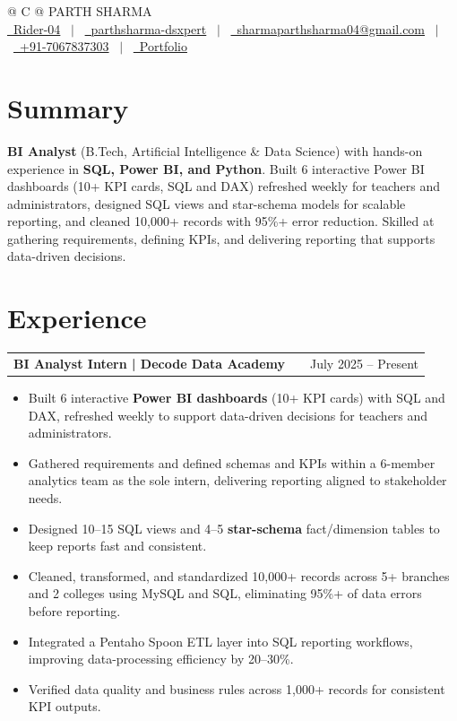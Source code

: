 \documentclass[a4paper,12pt]{article}
\makeatletter
\newenvironment{joblong}[2]
    {
    \begin{tabularx}{\linewidth}{@{}l X r@{}}
    \textbf{#1} & \hfill &  #2 \\[3.75pt]
    \end{tabularx}
    \begin{minipage}[t]{\linewidth}
    \begin{itemize}[nosep,after=\strut, leftmargin=1em, itemsep=3pt,label=--]
    }
    {
    \end{itemize}
    \end{minipage}
    }
\makeatother
\begin{document}
\pagestyle{empty}

\begin{tabularx}{\linewidth}{@{} C @{}}
\Huge{PARTH SHARMA} \\[7.5pt]
\href{https://github.com/Rider-04}{\raisebox{-0.05\height}\faGithub\ Rider-04} \ $|$ \
\href{https://www.linkedin.com/in/parthsharma-dsxpert}{\raisebox{-0.05\height}\faLinkedin\ parthsharma-dsxpert} \ $|$ \
\href{mailto:sharmaparthsharma04@gmail.com}{\raisebox{-0.05\height}\faEnvelope \ sharmaparthsharma04@gmail.com} \ $|$ \
\href{tel:+917067837303}{\raisebox{-0.05\height}\faMobile \ +91-7067837303} \ $|$ \
\href{https://parth-portfolio-virid.vercel.app/}{\raisebox{-0.05\height}\faGlobe \ Portfolio}\end{tabularx}


\section{Summary}
\textbf{BI Analyst} (B.Tech, Artificial Intelligence \& Data Science) with hands-on experience in \textbf{SQL, Power BI, and Python}. Built 6 interactive Power BI dashboards (10+ KPI cards, SQL and DAX) refreshed weekly for teachers and administrators, designed SQL views and star-schema models for scalable reporting, and cleaned 10,000+ records with 95\%+ error reduction. Skilled at gathering requirements, defining KPIs, and delivering reporting that supports data-driven decisions.

\section{Experience}

\begin{joblong}{BI Analyst Intern | Decode Data Academy}{July 2025 -- Present}
\item Built 6 interactive \textbf{Power BI dashboards} (10+ KPI cards) with SQL and DAX, refreshed weekly to support data-driven decisions for teachers and administrators.
\item Gathered requirements and defined schemas and KPIs within a 6-member analytics team as the sole intern, delivering reporting aligned to stakeholder needs.
\item Designed 10--15 SQL views and 4--5 \textbf{star-schema} fact/dimension tables to keep reports fast and consistent.
\item Cleaned, transformed, and standardized 10,000+ records across 5+ branches and 2 colleges using MySQL and SQL, eliminating 95\%+ of data errors before reporting.
\item Integrated a Pentaho Spoon ETL layer into SQL reporting workflows, improving data-processing efficiency by 20--30\%.
\item Verified data quality and business rules across 1,000+ records for consistent KPI outputs.
\vspace{10pt}
\end{joblong}
\end{document}
